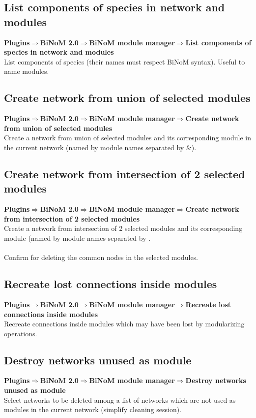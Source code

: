 \subsection{List components of species in network and modules}
\textbf{Plugins$\Rightarrow$BiNoM 2.0$\Rightarrow$BiNoM module manager$\Rightarrow$List components of species in network and modules}\\
List components of species (their names must respect BiNoM syntax). Useful to name modules.

\subsection{Create network from union of selected modules}
\textbf{Plugins$\Rightarrow$BiNoM 2.0$\Rightarrow$BiNoM module manager$\Rightarrow$Create network from union of selected modules}\\
Create a network from union of selected modules and its corresponding module in the current network (named by module names separated by \&).

\subsection{Create network from intersection of 2 selected modules}
\textbf{Plugins$\Rightarrow$BiNoM 2.0$\Rightarrow$BiNoM module manager$\Rightarrow$Create network from intersection of 2 selected modules}\\
Create a network from intersection of 2 selected modules and its corresponding module (named by module names separated by \textbar.\\\\
Confirm for deleting the common nodes in the selected modules.

\subsection{Recreate lost connections inside modules}
\textbf{Plugins$\Rightarrow$BiNoM 2.0$\Rightarrow$BiNoM module manager$\Rightarrow$Recreate lost connections inside modules}\\
Recreate connections inside modules which may have been lost by modularizing operations.

\subsection{Destroy networks unused as module}
\textbf{Plugins$\Rightarrow$BiNoM 2.0$\Rightarrow$BiNoM module manager$\Rightarrow$Destroy networks unused as module}\\
Select networks to be deleted among a list of networks which are not used as modules in the current network (simplify cleaning session).